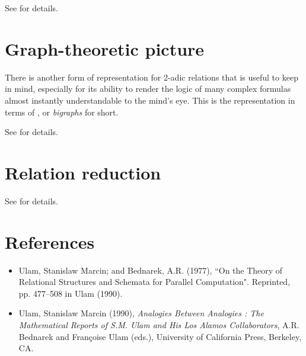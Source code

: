 \documentclass[12pt]{article}
\begin{document}
See  for details.

\section{Graph-theoretic picture}

There is another form of representation for 2-adic relations that is useful to keep in mind, especially for its ability to render the logic of many complex formulas almost instantly understandable to the mind's eye.  This is the representation in terms of \textit{}, or \textit{bigraphs} for short.

See  for details.

\section{Relation reduction}

See  for details.

\section{References}

\begin{itemize}
\item
Ulam, Stanislaw Marcin; and Bednarek, A.R. (1977), ``On the Theory of Relational Structures and Schemata for Parallel Computation".  Reprinted, pp. 477--508 in Ulam (1990).
\item
Ulam, Stanislaw Marcin (1990), \textit{Analogies Between Analogies : The Mathematical Reports of S.M. Ulam and His Los Alamos Collaborators}, A.R. Bednarek and Fran\c{c}oise Ulam (eds.), University of California Press, Berkeley, CA.
\end{itemize}

\end{document}

